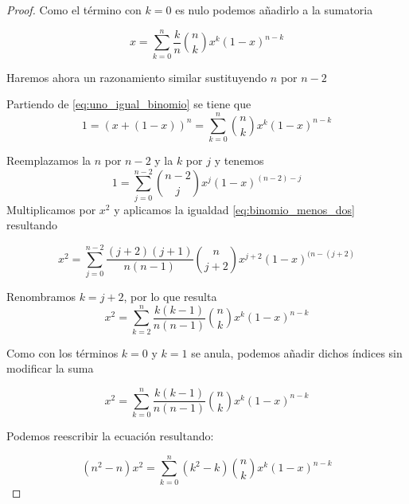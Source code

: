 \begin{proof}
    Como el término con $k=0$ es nulo podemos añadirlo a la sumatoria
    
    \begin{equation} \label{eq:desarrollo_binomio_uno}
        x = \sum_{k=0}^{n} \frac{k}{n} \binom{n}{k} x^{k} (1-x)^{n-k}
    \end{equation}

    Haremos ahora un razonamiento similar sustituyendo $n$ por $n-2$

    Partiendo de \eqref{eq:uno_igual_binomio} se tiene que 
    \begin{equation}
        1 = (x+ (1-x))^n = \sum_{k=0}^n \binom{n}{k} x^{k} (1-x)^{n-k}
    \end{equation}

    Reemplazamos la $n$ por $n-2$ y la $k$ por $j$ y tenemos 
    \begin{equation}
        1 = \sum_{j=0}^{n-2} \binom{n-2}{j} x^{j} (1-x)^{(n-2)-j}
    \end{equation}
    Multiplicamos por $x^2$ y aplicamos la igualdad \eqref{eq:binomio_menos_dos} resultando 

    \begin{equation}
        x^2 = \sum_{j=0}^{n-2} \frac{(j+2)(j+1)}{n(n-1)} \binom{n}{j+2} x^{j+2} (1-x)^{(n-(j+2)}
    \end{equation}

    Renombramos $k= j+2$, por lo que resulta
    \begin{equation}
        x^2 = \sum_{k=2}^{n} \frac{k(k-1)}{n(n-1)} \binom{n}{k} x^{k} (1-x)^{n-k}
    \end{equation}

    Como con los términos $k=0$ y $k=1$ se anula, podemos añadir dichos índices sin modificar la suma 
    
    \begin{equation}
        x^2 = \sum_{k=0}^{n} \frac{k(k-1)}{n(n-1)} \binom{n}{k} x^{k} (1-x)^{n-k}
    \end{equation}

    Podemos reescribir la ecuación resultando: 

    \begin{equation} \label{eq:desarrollo_binomio_dos}
      (n^2 - n)  x^2 = \sum_{k=0}^{n} (k^2 - k) \binom{n}{k} x^{k} (1-x)^{n-k}
    \end{equation}
    
    



\end{proof}
